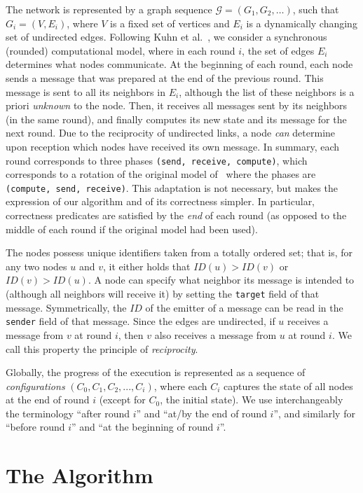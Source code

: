 \documentclass[twocolumn]{article}
\newcommand{\G}{\mathcal{G}}
\begin{document}
The network is represented by a graph sequence $\G=(G_1,G_2,\dots)$, such that $G_i=(V,E_i)$, where $V$ is a fixed set of vertices and $E_i$ is a dynamically changing set of undirected edges. 
Following Kuhn et al.~\cite{KLO10}, we consider a synchronous (rounded) computational model, where in each round $i$, the set of edges $E_i$ determines what nodes communicate. At the beginning of each round, each node sends a message that was prepared at the end of the previous round. This message is sent to all its neighbors in $E_i$, although the list of these neighbors is a priori {\em unknown} to the node. Then, it receives all messages sent by its neighbors (in the same round), and finally computes its new state and its message for the next round. Due to the reciprocity of undirected links, a node {\em can} determine upon reception which nodes have received its own message. In summary, each round corresponds to three phases {\tt (send, receive, compute)}, which corresponds to a rotation of the original model of~\cite{KLO10} where the phases are {\tt (compute, send, receive)}. This adaptation is not necessary, but makes the expression of our algorithm and of its correctness simpler. In particular, correctness predicates are satisfied by the {\em end} of each round (as opposed to the middle of each round if the original model had been used).




The nodes possess unique identifiers taken from a totally ordered set; that is, for any two nodes $u$ and $v$, it either holds that $ID(u)>ID(v)$ or $ID(v)>ID(u)$. A node can specify what neighbor its message is intended to (although all neighbors will receive it) by setting the {\tt target} field of that message. Symmetrically, the $ID$ of the emitter of a message can be read in the {\tt sender} field of that message. Since the edges are undirected, if $u$ receives a message from $v$ at round $i$, then $v$ also receives a message from $u$ at round $i$. We call this property the principle of \textit{reciprocity}.


Globally, the progress of the execution is represented as a sequence of {\em configurations} $(C_0, C_1, C_2, ... , C_i)$, where each $C_i$ captures the state of all nodes at the end of round $i$  (except for $C_0$, the initial state). We use interchangeably the terminology ``after round $i$'' and ``at/by the end of round $i$'', and similarly for ``before round $i$'' and ``at the beginning of round $i$''.


\section{The Algorithm}
\label{sec:algorithm}
\end{document}
